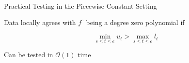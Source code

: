 \documentclass{beamer}
\begin{document}
\begin{frame}{Practical Testing in the Piecewise Constant Setting}

Data locally agrees with $f^\circ$ being a degree zero polynomial if

\begin{exampleblock}{}
\begin{equation*}
	\min_{s \leq t \leq e} u_t > \max_{s \leq t \leq e} l_t
\end{equation*}
\end{exampleblock}

Can be tested in $\mathcal{O}(1)$ time



\end{frame}
\end{document}
